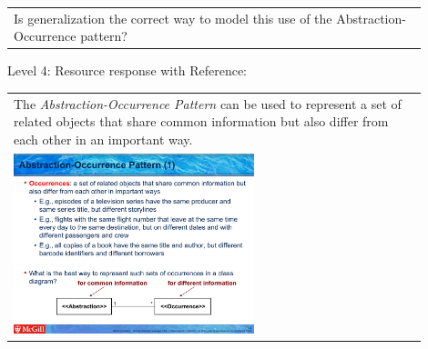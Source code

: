 \begin{tabular}{|p{0.9\linewidth}}
Is generalization the correct way to model this use of the Abstraction-Occurrence pattern?
\end{tabular} \medskip

\noindent Level 4: Resource response with Reference: \medskip

\begin{tabular}{|p{0.9\linewidth}}
The \textit{Abstraction-Occurrence Pattern} can be used to 
represent a set of related objects that share common information but also differ
from each other in an important way.

\\
\includegraphics[width=0.6\textwidth]{images/abstraction_occurrence.png}
\end{tabular} \medskip



